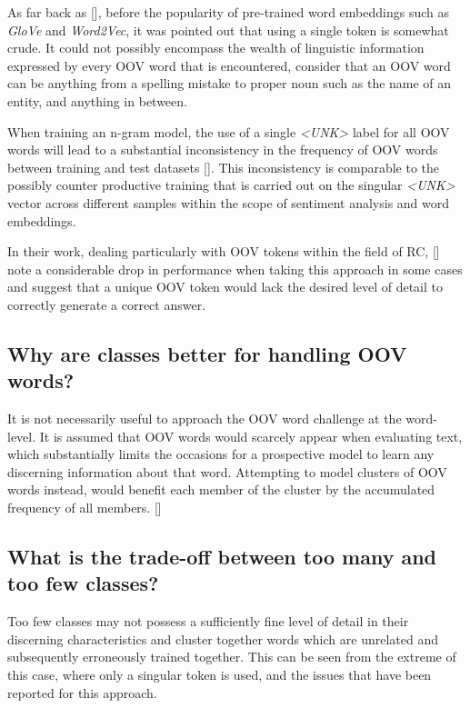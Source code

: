 \documentclass[12pt, a4paper]{report}
\newcommand{\unk}{\textit{\textless{UNK}\textgreater} }
\theoremstyle{definition}
\theoremstyle{definition}%
\theoremstyle{definition}%
\theoremstyle{definition}%
\theoremstyle{definition}%
\theoremstyle{definition}%
\renewcommand{\cite}[1]{[\citealp{#1}]}
\begin{document}
As far back as \cite{gallwitz1996}, before the popularity of pre-trained word embeddings such as \textit{GloVe} and \textit{Word2Vec}, it was pointed out that using a single token is somewhat crude. It could not possibly encompass the wealth of linguistic information expressed by every OOV word that is encountered, consider that an OOV word can be anything from a spelling mistake to proper noun such as the name of an entity, and anything in between.  

When training an n-gram model, the use of a single \unk label for all OOV words will lead to a substantial inconsistency in the frequency of OOV words between training and test datasets \cite{gallwitz1996}. This inconsistency is comparable to the possibly counter productive training that is carried out on the singular \unk vector across different samples within the scope of sentiment analysis and word embeddings.

In their work, dealing particularly with OOV tokens within the field of RC, \cite{bhuwandhingra2017} note a considerable drop in performance when taking this approach in some cases and suggest that a unique OOV token would lack the desired level of detail to correctly generate a correct answer. 

\subsection{Why are classes better for handling OOV words?}
It is not necessarily useful to approach the OOV word challenge at the word-level. It is assumed that OOV words would scarcely appear when evaluating text, which substantially limits the occasions for a prospective model to learn any discerning information about that word. Attempting to model clusters of OOV words instead, would benefit each member of the cluster by the accumulated frequency of all members. \cite{naptali2012}

\subsection{What is the trade-off between too many and too few classes?}

Too few classes may not possess a sufficiently fine level of detail in their discerning characteristics and cluster together words which are unrelated and subsequently erroneously trained together. This can be seen from the extreme of this case, where only a singular token is used, and the issues that have been reported for this approach.
\end{document}
